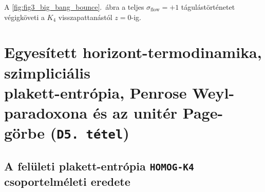 \documentclass[11pt,a4paper]{article}
\theoremstyle{remark}
\begin{document}
A \ref{fig:fig3_big_bang_bounce}.\ \'abra a teljes $\sigma_{\mathrm{flow}} = +1$ t\'agul\'ast\"ort\'enetet v\'egigk\"oveti a $K_4$ visszapattan\'ast\'ol $z = 0$-ig.

\section[Egyes\'itett horizont-termodinamika, szimplici\'alis plakett-entr\'opia, Penrose Weyl-paradoxona \'es az unit\'er Page-g\"orbe (\texttt{D5.\ t\'etel})]{\texorpdfstring{Egyes\'itett horizont-termodinamika, szimplici\'alis\\ plakett-entr\'opia, Penrose Weyl-paradoxona \'es az unit\'er Page-g\"orbe (\texttt{D5.\ t\'etel})}{Egyesitett horizont-termodinamika, szimplicialis plakett-entropia, Penrose Weyl-paradoxona es az uniter Page-gorbe (D5. tetel)}}
\label{sec:thermodynamics}

\subsection{A fel\"uleti plakett-entr\'opia \texttt{HOMOG-K4} csoportelm\'eleti eredete}
\end{document}
